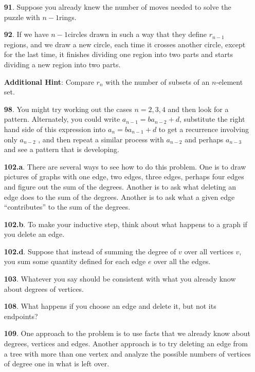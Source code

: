 \documentclass[10pt,]{book}
\theoremstyle{plain}
\theoremstyle{definition}
\theoremstyle{definition}
\numberwithin{equation}{chapter}
\begin{document}
\begin{itemize}[itemsep=1em]
\item[\textbf{91}.]Suppose you already knew the number of moves needed to solve the puzzle with \(n-1\)rings.%

\item[\textbf{92}.]If we have \(n - 1\)circles drawn in such a way that they define \(r_{n-1}\) regions, and we draw a new circle, each time it crosses another circle, except for the last time, it finishes dividing one region into two parts and starts dividing a new region into two parts.%

\par\smallskip
\noindent\textbf{Additional Hint}: Compare \(r_n\) with the number of subsets of an \(n\)-element set.%

\item[\textbf{98}.]You might try working out the cases \(n=2,3,4\) and then look for a pattern. Alternately, you could write \(a_{n-1}=b a_{n-2} + d\), substitute the right hand side of this expression into \(a_{n}=b a_{n-1} + d\) to get a recurrence involving only \(a_{n-2}\) , and then repeat a similar process with \(a_{n-2}\) and perhaps \(a_{n-3}\) and see a pattern that is developing.%

\item[\textbf{102.a}.]There are several ways to see how to do this problem. One is to draw pictures of graphs with one edge, two edges, three edges, perhaps four edges and figure out the sum of the degrees. Another is to ask what deleting an edge does to the sum of the degrees. Another is to ask what a given edge ``contributes'' to the sum of the degrees.%

\item[\textbf{102.b}.]To make your inductive step, think about what happens to a graph if you delete an edge.%

\item[\textbf{102.d}.]Suppose that instead of summing the degree of \(v\) over all vertices \(v\), you sum some quantity defined for each edge \(e\) over all the edges.%

\item[\textbf{103}.]Whatever you say should be consistent with what you already know about degrees of vertices.%

\item[\textbf{108}.]What happens if you choose an edge and delete it, but not its endpoints?%

\item[\textbf{109}.]One approach to the problem is to use facts that we already know about degrees, vertices and edges. Another approach is to try deleting an edge from a tree with more than one vertex and analyze the possible numbers of vertices of degree one in what is left over.%


\end{itemize}
\end{document}
